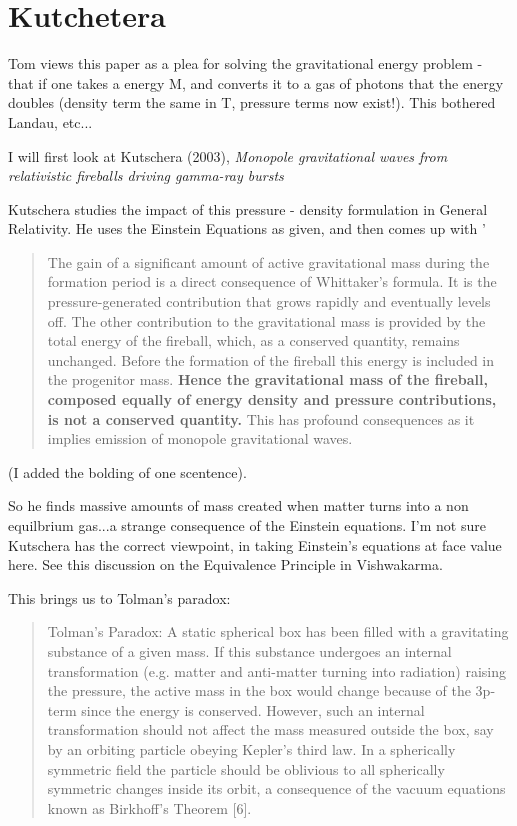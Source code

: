 \documentclass[../rzero]{subfiles}
\begin{document}
\section{Kutchetera}
Tom views this paper as a plea for solving the gravitational energy problem - that if one takes a energy M, and converts it to a gas of photons that the energy doubles (density term the same in T, pressure terms now exist!). This bothered Landau, etc... 

 

I will first look at Kutschera (2003)\cite{Kutschera2003}, \textit{Monopole gravitational waves from relativistic fireballs driving gamma-ray bursts}

Kutschera studies the impact of this pressure - density formulation in General Relativity. He uses the Einstein Equations as given, and then comes up with '
\begin{quotation}
		The gain of a significant amount of active gravitational mass during the formation period is a direct consequence of Whittaker's formula. It is the pressure-generated contribution that grows rapidly and eventually levels off. The other contribution to the gravitational mass is provided by the total energy of the fireball, which, as a conserved quantity, remains unchanged. Before the formation of the fireball this energy is included in the progenitor mass. \textbf{Hence the gravitational mass of the fireball, composed equally of energy density and pressure contributions, is not a conserved quantity.} This has profound consequences as it implies emission of monopole gravitational waves.
\end{quotation} (I added the bolding of one scentence).

So he finds massive amounts of mass created when matter turns into a non equilbrium gas...a strange consequence of the Einstein equations. I'm not sure Kutschera has the correct viewpoint, in taking Einstein's equations at face value here. See this discussion on the Equivalence Principle in Vishwakarma\cite{vishwakarmaEinsteinCriticalPerspective2016}.

This brings us to Tolman's paradox:
\begin{quotation}
	Tolman’s Paradox: A static spherical box has been filled with a gravitating substance of a given mass. If this substance undergoes an internal transformation (e.g. matter and anti-matter turning into radiation) raising the pressure, the active mass in the box would change because of the 3p-term since the energy is conserved. However, such an internal transformation should not affect the mass measured outside the box, say by an orbiting particle obeying Kepler’s third law. In a spherically symmetric field the particle should be oblivious to all spherically symmetric changes inside its orbit, a consequence of the vacuum equations known as Birkhoff’s Theorem [6].
\end{quotation}
\end{document}
